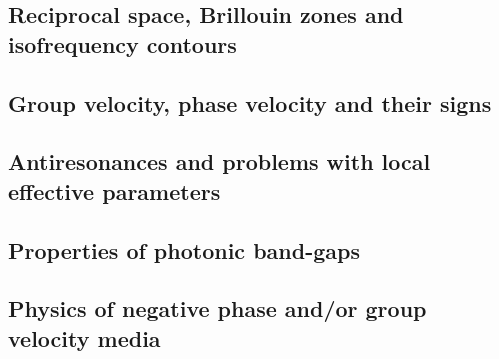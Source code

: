 \subsection{Reciprocal space, Brillouin zones and isofrequency contours}
\subsection{Group velocity, phase velocity and their signs}
\subsection{Antiresonances and problems with local effective parameters}



\subsection{Properties of photonic band-gaps}
\subsection{Physics of negative phase and/or group velocity media}


